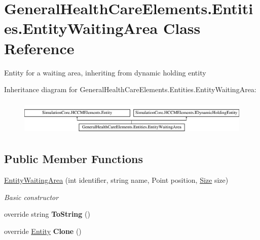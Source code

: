 \hypertarget{class_general_health_care_elements_1_1_entities_1_1_entity_waiting_area}{}\section{General\+Health\+Care\+Elements.\+Entities.\+Entity\+Waiting\+Area Class Reference}
\label{class_general_health_care_elements_1_1_entities_1_1_entity_waiting_area}


Entity for a waiting area, inheriting from dynamic holding entity  


Inheritance diagram for General\+Health\+Care\+Elements.\+Entities.\+Entity\+Waiting\+Area\+:\begin{figure}[H]
\begin{center}
\leavevmode
\includegraphics[height=1.712538cm]{class_general_health_care_elements_1_1_entities_1_1_entity_waiting_area}
\end{center}
\end{figure}
\subsection*{Public Member Functions}
\begin{DoxyCompactItemize}
\item 
\hyperlink{class_general_health_care_elements_1_1_entities_1_1_entity_waiting_area_a8ba46176fde097776ccf56390c403f33}{Entity\+Waiting\+Area} (int identifier, string name, Point position, \hyperlink{class_general_health_care_elements_1_1_entities_1_1_entity_waiting_area_ac188423086574de63ddf76b800237976}{Size} size)
\begin{DoxyCompactList}\small\item\em Basic constructor \end{DoxyCompactList}\item 
override string {\bfseries To\+String} ()\hypertarget{class_general_health_care_elements_1_1_entities_1_1_entity_waiting_area_a7649e52b845e2ce662f88f3194ca4405}{}\label{class_general_health_care_elements_1_1_entities_1_1_entity_waiting_area_a7649e52b845e2ce662f88f3194ca4405}

\item 
override \hyperlink{class_simulation_core_1_1_h_c_c_m_elements_1_1_entity}{Entity} {\bfseries Clone} ()\hypertarget{class_general_health_care_elements_1_1_entities_1_1_entity_waiting_area_a547ce52eae62400c149009c4ae331281}{}\label{class_general_health_care_elements_1_1_entities_1_1_entity_waiting_area_a547ce52eae62400c149009c4ae331281}

\end{DoxyCompactItemize}

